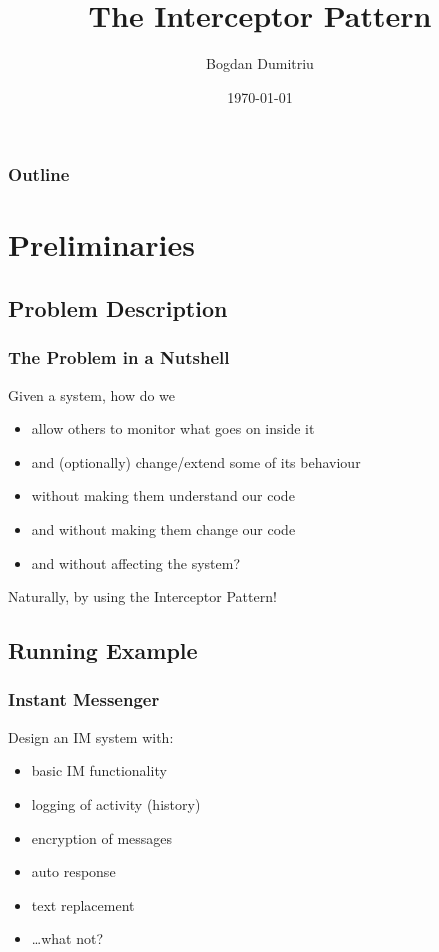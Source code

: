 \documentclass{beamer}
\title{The Interceptor Pattern}
\author{Bogdan Dumitriu}
\institute
{
  Department of Computer Science\\
  University of Utrecht
}
\date{\today}
\begin{document}
\begin{frame}
  \titlepage
\end{frame}

\begin{frame}
  \frametitle{Outline}
  \tableofcontents
\end{frame}

\section{Preliminaries}

\subsection{Problem Description}

\begin{frame}
  \frametitle{The Problem in a Nutshell}

  Given a system, how do we
  \begin{itemize}
  \item allow others to monitor what goes on inside it
  \pause
  \item and (optionally) change/extend some of its behaviour
  \pause
  \item without making them understand our code
  \pause
  \item and without making them change our code
  \pause
  \item and without affecting the system?
  \end{itemize}
  \pause
  Naturally, by using the \alert{Interceptor Pattern}!

\end{frame}

\subsection{Running Example}

\begin{frame}
  \frametitle{Instant Messenger}

  Design an IM system with:
  \begin{itemize}
  \item basic IM functionality
  \item logging of activity (history)
  \item encryption of messages
  \item auto response
  \item text replacement
  \item \ldots what not?
  \end{itemize}

  \begin{flushright}
  \end{flushright}

\end{frame}
\end{document}
